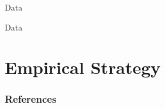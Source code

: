 \documentclass [xcolor=svgnames, t] {beamer}
\begin{document}
\begin{frame}{Data}
\begin{table}[H]
    \centering
    \tiny
    
    \label{tab:my_label}
\end{table}
\end{frame}


\begin{frame}{Data}
\begin{table}[H]
    \centering
    \tiny
    
    \label{tab:my_label}
\end{table}
\end{frame}




\section{Empirical Strategy}
    

\begin{frame} [allowframebreaks]\frametitle{References}
               
        
        
\end{frame}
\end{document}

